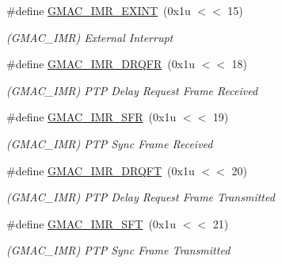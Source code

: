 \begin{DoxyCompactItemize}
\mbox{\label{group__SAMV71__GMAC_ga52c451f3353a34b215a4c83e90802ee0}} 
\#define \mbox{\hyperlink{group__SAMV71__GMAC_ga52c451f3353a34b215a4c83e90802ee0}{G\+M\+A\+C\+\_\+\+I\+M\+R\+\_\+\+E\+X\+I\+NT}}~(0x1u $<$$<$ 15)
\begin{DoxyCompactList}\small\item\em (G\+M\+A\+C\+\_\+\+I\+MR) External Interrupt \end{DoxyCompactList}\item 
\mbox{\label{group__SAMV71__GMAC_ga5130dd10846e8befe28a57f66621a9ee}} 
\#define \mbox{\hyperlink{group__SAMV71__GMAC_ga5130dd10846e8befe28a57f66621a9ee}{G\+M\+A\+C\+\_\+\+I\+M\+R\+\_\+\+D\+R\+Q\+FR}}~(0x1u $<$$<$ 18)
\begin{DoxyCompactList}\small\item\em (G\+M\+A\+C\+\_\+\+I\+MR) P\+TP Delay Request Frame Received \end{DoxyCompactList}\item 
\mbox{\label{group__SAMV71__GMAC_ga959366c426d9f60f71837a0c8cd741f0}} 
\#define \mbox{\hyperlink{group__SAMV71__GMAC_ga959366c426d9f60f71837a0c8cd741f0}{G\+M\+A\+C\+\_\+\+I\+M\+R\+\_\+\+S\+FR}}~(0x1u $<$$<$ 19)
\begin{DoxyCompactList}\small\item\em (G\+M\+A\+C\+\_\+\+I\+MR) P\+TP Sync Frame Received \end{DoxyCompactList}\item 
\mbox{\label{group__SAMV71__GMAC_gae805f71830f07a81e460eeda3911152d}} 
\#define \mbox{\hyperlink{group__SAMV71__GMAC_gae805f71830f07a81e460eeda3911152d}{G\+M\+A\+C\+\_\+\+I\+M\+R\+\_\+\+D\+R\+Q\+FT}}~(0x1u $<$$<$ 20)
\begin{DoxyCompactList}\small\item\em (G\+M\+A\+C\+\_\+\+I\+MR) P\+TP Delay Request Frame Transmitted \end{DoxyCompactList}\item 
\mbox{\label{group__SAMV71__GMAC_gaa70500f5bace97033260ae3065ed8ada}} 
\#define \mbox{\hyperlink{group__SAMV71__GMAC_gaa70500f5bace97033260ae3065ed8ada}{G\+M\+A\+C\+\_\+\+I\+M\+R\+\_\+\+S\+FT}}~(0x1u $<$$<$ 21)
\begin{DoxyCompactList}\small\item\em (G\+M\+A\+C\+\_\+\+I\+MR) P\+TP Sync Frame Transmitted \end{DoxyCompactList}\item 
$$
\end{DoxyCompactItemize}
